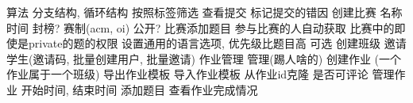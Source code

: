 \markdownRendererUlItem 算法\markdownRendererUlItemEnd 
\markdownRendererUlItem 分支结构, 循环结构\markdownRendererUlItemEnd 
\markdownRendererUlItem 按照标签筛选\markdownRendererUlItemEnd 
\markdownRendererUlEndTight \markdownRendererInterblockSeparator
{}\markdownRendererInterblockSeparator
{}\markdownRendererUlBeginTight
\markdownRendererUlItem 查看提交\markdownRendererUlItemEnd 
\markdownRendererUlItem 标记提交的错因\markdownRendererUlItemEnd 
\markdownRendererUlEndTight \markdownRendererInterblockSeparator
{}\markdownRendererInterblockSeparator
{}\markdownRendererUlBeginTight
\markdownRendererUlItem 创建比赛\markdownRendererUlItemEnd 
\markdownRendererUlItem 名称\markdownRendererUlItemEnd 
\markdownRendererUlItem 时间\markdownRendererUlItemEnd 
\markdownRendererUlItem 封榜?\markdownRendererUlItemEnd 
\markdownRendererUlItem 赛制(acm, oi)\markdownRendererUlItemEnd 
\markdownRendererUlItem {}\markdownRendererUlItemEnd 
\markdownRendererUlItem 公开?\markdownRendererUlItemEnd 
\markdownRendererUlItem 比赛添加题目\markdownRendererUlItemEnd 
\markdownRendererUlItem 参与比赛的人自动获取 比赛中的即使是private的题的权限\markdownRendererUlItemEnd 
\markdownRendererUlItem 设置通用的语言选项, 优先级比题目高  可选\markdownRendererUlItemEnd 
\markdownRendererUlEndTight \markdownRendererInterblockSeparator
{}\markdownRendererInterblockSeparator
{}\markdownRendererUlBeginTight
\markdownRendererUlItem 创建班级\markdownRendererUlItemEnd 
\markdownRendererUlItem 邀请学生(邀请码, 批量创建用户, 批量邀请)\markdownRendererUlItemEnd 
\markdownRendererUlItem 作业管理\markdownRendererUlItemEnd 
\markdownRendererUlItem 管理(踢人啥的)\markdownRendererUlItemEnd 
\markdownRendererUlEndTight \markdownRendererInterblockSeparator
{}\markdownRendererInterblockSeparator
{}\markdownRendererUlBeginTight
\markdownRendererUlItem 创建作业 (一个作业属于一个班级)\markdownRendererUlItemEnd 
\markdownRendererUlItem 导出作业模板\markdownRendererUlItemEnd 
\markdownRendererUlItem 导入作业模板\markdownRendererUlItemEnd 
\markdownRendererUlItem 从作业id克隆\markdownRendererUlItemEnd 
\markdownRendererUlItem 是否可评论\markdownRendererUlItemEnd 
\markdownRendererUlItem 管理作业\markdownRendererUlItemEnd 
\markdownRendererUlItem 开始时间, 结束时间\markdownRendererUlItemEnd 
\markdownRendererUlItem 添加题目\markdownRendererUlItemEnd 
\markdownRendererUlItem 查看作业完成情况\markdownRendererUlItemEnd 
